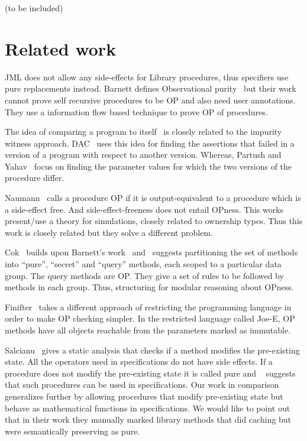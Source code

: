 \documentclass{llncs}
\begin{document}
(to be included)
\section{Related work}
JML does not allow any side-effects for Library procedures, thus
specifiers use pure replacements instead. Barnett defines
Observational purity~\cite{barnett200499} but their work cannot prove
self recursive procedures to be OP and also need user
annotations. They use a information flow based technique to prove OP
of procedures.

The idea of comparing a program to itself~\cite{lahiri2013differential}
\cite{partush2013abstract} is closely related to the impurity witness
approach. DAC~\cite{lahiri2013differential} uses this idea for
finding the assertions that failed in a version of a program with
respect to another version. Whereas, Partush and
Yahav~\cite{partush2013abstract} focus on finding the parameter values
for which the two versions of the procedure differ.

Naumann~\cite{naumann2007observational} calls a procedure OP if it is
output-equivalent to a procedure which is a side-effect free. And
side-effect-freeness does not entail OPness. This works present/use
a theory for simulations, closely related to ownership types. Thus
this work is closely related but they solve a different problem.

Cok~\cite{cok2008extensions} builds upon Barnett's
work~\cite{barnett2006allowing} and~\cite{barnett200499} suggests
partitioning the set of methods into ``pure'', ``secret'' and ``query''
methods, each scoped to a particular data group. The query methods are
OP. They give a set of rules to be followed by methods in each
group. Thus, structuring for modular reasoning about OPness.

Finifter~\cite{cok2008extensions} takes a different approach of restricting
the programming language in order to make OP checking simpler. In the
restricted language called Joe-E, OP methods have all objects reachable
from the parameters marked as immutable.

Salcianu~\cite{sualcianu2005purity} gives a static analysis
that checks if a method modifies the pre-existing state. All the
operators used in specifications do not have side effects. If a
procedure does not modify the pre-existing state it is called pure and
~\cite{barnett200499} suggests that such procedures can be used in
specifications. Our work in comparison generalizes further by
allowing procedures that modify pre-existing state but behave as
mathematical functions in specifications. We would like to point out
that in their work they manually marked library methods that did
caching but were semantically preserving as pure.
\end{document}
